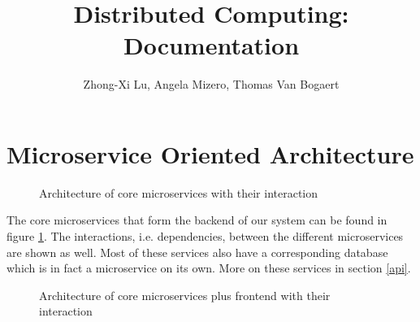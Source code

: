 \documentclass{article}
\title{Distributed Computing: Documentation}
\author{Zhong-Xi Lu, Angela Mizero, Thomas Van Bogaert}
\date{}
\begin{document}
\maketitle

\section{Microservice Oriented Architecture}

\begin{figure}[H]
    \begin{center}
    \end{center}
    \caption{Architecture of core microservices with their interaction}
    \label{fig:arch}
\end{figure}

The core microservices that form the backend of our system can be found in figure \ref{fig:arch}. The interactions, i.e. dependencies, between the different microservices are shown as well. Most of these services also have a corresponding database which is in fact a microservice on its own. More on these services in section \ref{api}.

\begin{figure}[H]
    \begin{center}
    \end{center}
    \caption{Architecture of core microservices plus frontend with their interaction}
    \label{fig:arch_frontend}
\end{figure}
\end{document}
